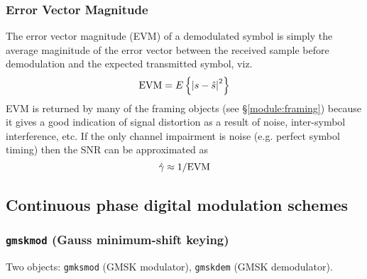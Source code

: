 \subsubsection{Error Vector Magnitude}
\label{module:modem:digital:evm}
The error vector magnitude (EVM) of a demodulated symbol is simply the
average maginitude of the error vector between the received sample
before demodulation and the expected transmitted symbol, viz.
%
\begin{equation}
\label{eqn:modem:evm}
    \textup{EVM} = E\left\{ \left| s - \hat{s} \right|^2 \right\}
\end{equation}
%
EVM is returned by many of the framing objects
(see \S\ref{module:framing})
because it gives a good indication of signal distortion as a result of
noise, inter-symbol interference, etc.
If the only channel impairment is noise (e.g. perfect symbol timing)
then the SNR can be approximated as
\[
    \hat{\gamma} \approx 1 / \textup{EVM}
\]


%
%

\subsection{Continuous phase digital modulation schemes}
\label{module:modem:cpm}

\subsubsection{{\tt gmskmod} (Gauss minimum-shift keying)}
\label{module:modem:cpm:gmskmod}

Two objects: {\tt gmksmod} (GMSK modulator), {\tt gmskdem} (GMSK
demodulator).
%

%
